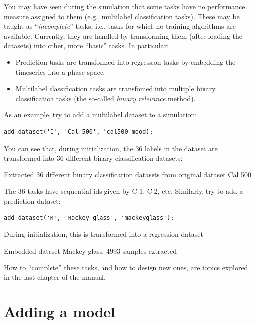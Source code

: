 You may have seen during the simulation that some tasks have no performance measure assigned to them (e.g., multilabel classification tasks). These may be taught as ``\textit{incomplete}'' tasks, i.e., tasks for which no training algorithms are available. Currently, they are handled by transforming them (after loading the datasets) into other, more ``basic'' tasks. In particular:

\begin{itemize}
\item Prediction tasks are transformed into regression tasks by embedding the timeseries into a phase space.
\item Multilabel classification tasks are transfomed into multiple binary classification tasks (the so-called \textit{binary relevance} method).
\end{itemize}

As an example, try to add a multilabel dataset to a simulation:

\begin{lstlisting}
add_dataset('C', 'Cal 500', 'cal500_mood);
\end{lstlisting}

\noindent You can see that, during initialization, the $36$ labels in the dataset are transformed into $36$ different binary classification datasets:

\begin{console}
Extracted 36 different binary classification datasets from original
  dataset Cal 500
\end{console}

\noindent The $36$ tasks have sequential ids given by C-1, C-2, etc. Similarly, try to add a prediction dataset:

\begin{lstlisting}
add_dataset('M', 'Mackey-glass', 'mackeyglass');
\end{lstlisting}

\noindent During initialization, this is transformed into a regression dataset:

\begin{console}
Embedded dataset Mackey-glass, 4993 samples extracted
\end{console}

How to ``complete'' these tasks, and how to design new ones, are topics explored in the last chapter of the manual.

\section{Adding a model}


